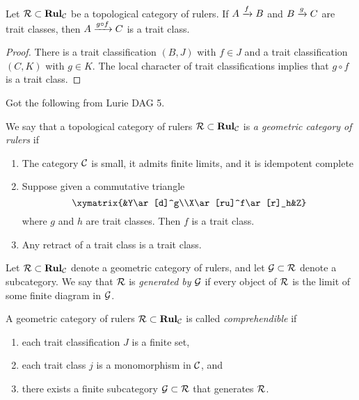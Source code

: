 \documentclass{amsart}
\def\Rul{{\bf Rul}}
\begin{document}
\begin{lemma}

Let $\mcR\ss\Rul_\mcC$ be a topological category of rulers.  If $A\xrightarrow{f}B$ and $B\xrightarrow{g}C$ are trait classes, then $A\xrightarrow{g\circ f}C$ is a trait class.

\end{lemma}

\begin{proof}

There is a trait classification $(B,J)$ with $f\in J$ and a trait classification $(C,K)$ with $g\in K$.  The local character of trait classifications implies that $g\circ f$ is a trait class.

\end{proof}

Got the following from Lurie DAG 5.

\begin{definition}

We say that a topological category of rulers $\mcR\ss\Rul_\mcC$ is {\em a geometric category of rulers} if \begin{enumerate}\item The category $\mathcal{C}$ is small, it admits finite limits, and it is idempotent complete\item Suppose given a commutative triangle $$\xymatrix{&Y\ar[d]^g\\X\ar[ru]^f\ar[r]_h&Z}$$ where $g$ and $h$ are trait classes.  Then $f$ is a trait class.\item Any retract of a trait class is a trait class.\end{enumerate}

\end{definition}

\begin{definition}

Let $\mcR\ss\Rul_\mcC$ denote a geometric category of rulers, and let $\mathcal{G}\subset\mathcal{R}$ denote a subcategory.  We say that $\mathcal{R}$ is {\em generated by} $\mathcal{G}$ if every object of $\mathcal{R}$ is the limit of some finite diagram in $\mathcal{G}$. 

\end{definition}

\begin{definition}

A geometric category of rulers $\mcR\ss\Rul_\mcC$ is called {\em comprehendible} if \begin{enumerate}\item each trait classification $J$ is a finite set,\item each trait class $j$ is a monomorphism in $\mathcal{C}$, and \item there exists a finite subcategory $\mathcal{G}\subset\mathcal{R}$ that generates $\mathcal{R}$. \end{enumerate}

\end{definition}
\end{document}
